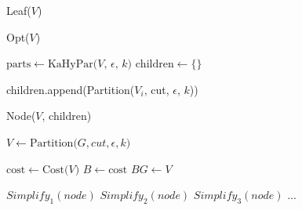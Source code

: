 \documentclass{article}
\begin{document}
\newpage
\begin{algorithm}
\caption{Hyper-par-part}
\begin{algorithmic}
        \State \Return Leaf($V$)
    \EndIf

        \State \Return Opt($V$)
    \EndIf
    \Statex

    \State $\text{parts} \gets \text{KaHyPar($V$, $\epsilon$, $k$)}$   
    \State $\text{children} \gets \{\}$
    \Statex

        \State children.append(Partition($V_i$, cut, $\epsilon$, $k$))
    \EndFor
    
    \State \Return Node($V$, children)
\EndFunction
\Statex


\State $V \gets \text{Partition(${G, cut, \epsilon, k}$)}$

\State $\text{cost} \gets \text{Cost($V$)}$
    \State $B \gets \text{cost}$
    \State $BG \gets V$
\EndIf

\EndFor


\end{algorithmic}
\end{algorithm}

\newpage
\begin{algorithm}
\caption{Opt}
\begin{algorithmic}

        \State $Simplify_1(node)$
        \State $Simplify_2(node)$
        \State $Simplify_3(node)$
        \State ...
    \EndFor
\EndWhile

\end{algorithmic}
\end{algorithm}

\newpage
\end{document}
